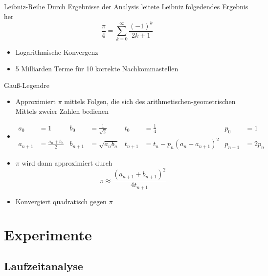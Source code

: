 \documentclass[9pt, t]{beamer}
\begin{document}
\begin{frame}{Leibniz-Reihe}
    Durch Ergebnisse der Analysis leitete Leibniz folgedendes Ergebnis her \cite{Leibniz}
    \[ \frac{\pi}{4} = \sum_{k=0}^{\infty} \frac{(-1)^k}{2k+1} \]
    \begin{itemize}
        \item<3-> Logarithmische Konvergenz \\
        \item<3-> 5 Milliarden Terme für 10 korrekte Nachkommastellen \cite{Leibniz-Approximation}
    \end{itemize}
\end{frame}

\begin{frame}{Gauß-Legendre}                                                                                                        %
    \begin{itemize}
        \item<1-> Approximiert \(\pi\) mittels Folgen, die sich des arithmetischen-geometrischen Mittels zweier Zahlen bedienen
        \item<2->
            \begin{align*}
            a_0     & = 1                   & b_0     & = \frac{1}{\sqrt{2}}                   & t_0     & = \frac{1}{4}                           & p_0     & = 1            \\
            a_{n+1} & = \frac{a_n + b_n}{2} & b_{n+1} & = \sqrt{a_n b_n}                       & t_{n+1} & =t_n - p_n(a_n - a_{n+1})^2             & p_{n+1} & = 2p_n
            \end{align*}    
        \item<3-> \(\pi\) wird dann approximiert durch \[ \pi \approx \frac{(a_{n+1} + b_{n+1})^2}{4t_{n+1}} \]
        \item<4-> Konvergiert quadratisch gegen \(\pi\) \cite{Gauß-Legendre}
    \end{itemize}
\end{frame}

\section{Experimente}

\subsection{Laufzeitanalyse}
\end{document}
